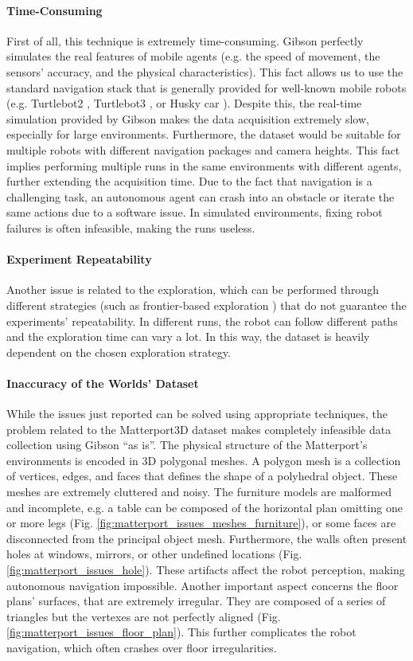 \paragraph*{Time-Consuming} First of all, this technique is extremely time-consuming. Gibson perfectly simulates the real features of mobile agents (e.g. the speed of movement, the sensors' accuracy, and the physical characteristics). This fact allows us to use the standard navigation stack that is generally provided for well-known mobile robots (e.g. Turtlebot2 \cite{turtlebot2}, Turtlebot3 \cite{turtlebot3}, or Husky car \cite{husky}). Despite this, the real-time simulation provided by Gibson makes the data acquisition extremely slow, especially for large environments.  Furthermore, the dataset would be suitable for multiple robots with different navigation packages and camera heights. This fact implies performing multiple runs in the same environments with different agents, further extending the acquisition time. Due to the fact that navigation is a challenging task, an autonomous agent can crash into an obstacle or iterate the same actions due to a software issue. In simulated environments, fixing robot failures is often infeasible, making the runs useless. 

\paragraph*{Experiment Repeatability} Another issue is related to the exploration, which can be performed through different strategies (such as frontier-based exploration \cite{frontierexploration}) that do not guarantee the experiments' repeatability. In different runs, the robot can follow different paths and the exploration time can vary a lot. In this way, the dataset is heavily dependent on the chosen exploration strategy.

\paragraph*{Inaccuracy of the Worlds' Dataset} While the issues just reported can be solved using appropriate techniques, the problem related to the Matterport3D dataset makes completely infeasible data collection using Gibson ``as is''. The physical structure of the Matterport's environments is encoded in 3D polygonal meshes. A polygon mesh is a collection of vertices, edges, and faces that defines the shape of a polyhedral object. These meshes are extremely cluttered and noisy. The furniture models are malformed and incomplete, e.g. a table can be composed of the horizontal plan omitting one or more legs (Fig. \ref{fig:matterport_issues_meshes_furniture}), or some faces are disconnected from the principal object mesh. Furthermore, the walls often present holes at windows, mirrors, or other undefined locations (Fig. \ref{fig:matterport_issues_hole}). These artifacts affect the robot perception, making autonomous navigation impossible. Another important aspect concerns the floor plans' surfaces, that are extremely irregular. They are composed of a series of triangles but the vertexes are not perfectly aligned (Fig. \ref{fig:matterport_issues_floor_plan}). This further complicates the robot navigation, which often crashes over floor irregularities.

